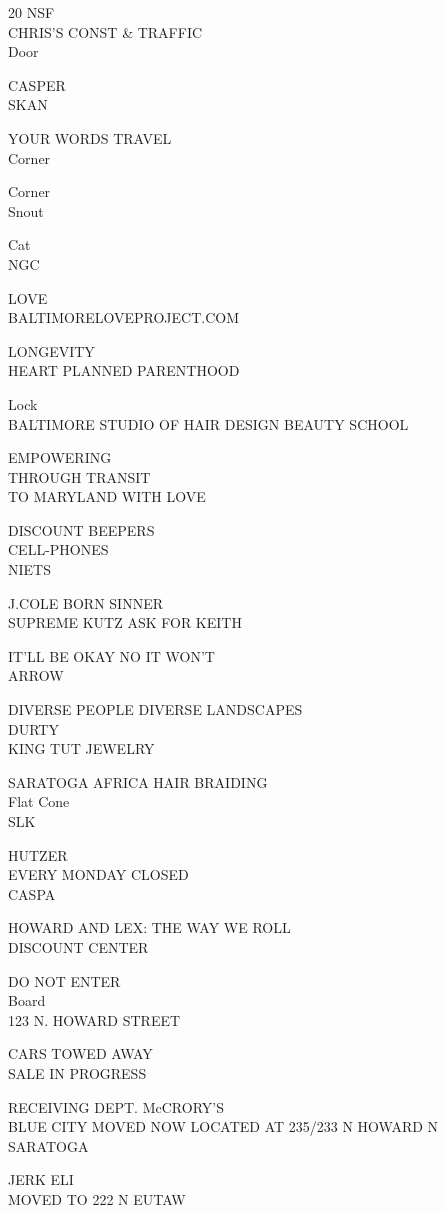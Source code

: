 \documentclass[10pt,letterpaper]{article}
\begin{document}
20 NSF\\
CHRIS'S CONST \& TRAFFIC\\
Door

CASPER\\
SKAN

YOUR WORDS TRAVEL\\
Corner

Corner\\
Snout

Cat\\
NGC

LOVE\\
BALTIMORELOVEPROJECT.COM

LONGEVITY\\
HEART PLANNED PARENTHOOD

Lock\\
BALTIMORE STUDIO OF HAIR DESIGN BEAUTY SCHOOL

EMPOWERING\\
THROUGH TRANSIT\\
TO MARYLAND WITH LOVE

DISCOUNT BEEPERS\\
CELL{-}PHONES\\
NIETS

J.COLE BORN SINNER\\
SUPREME KUTZ ASK FOR KEITH

IT'LL BE OKAY NO IT WON'T\\
ARROW

DIVERSE PEOPLE DIVERSE LANDSCAPES\\
DURTY\\
KING TUT JEWELRY

SARATOGA AFRICA HAIR BRAIDING\\
Flat Cone\\
SLK

HUTZER\\
EVERY MONDAY CLOSED\\
CASPA

HOWARD AND LEX: THE WAY WE ROLL\\
DISCOUNT CENTER

DO NOT ENTER\\
Board\\
123 N. HOWARD STREET

CARS TOWED AWAY\\
SALE IN PROGRESS

RECEIVING DEPT. McCRORY'S\\
BLUE CITY MOVED NOW LOCATED AT 235/233 N HOWARD N SARATOGA

JERK ELI\\
MOVED TO 222 N EUTAW
\end{document}
